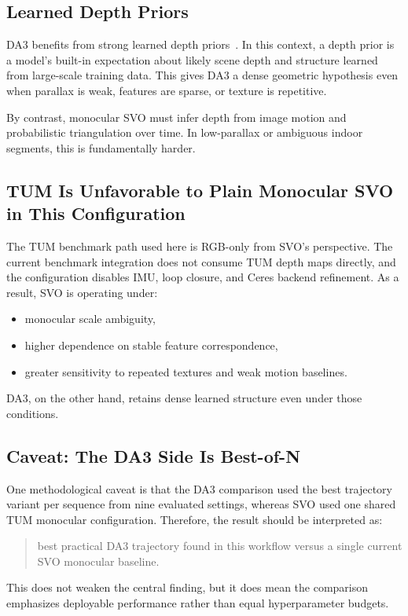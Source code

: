 \documentclass[conference]{IEEEtran}
\begin{document}
\subsection{Learned Depth Priors}
DA3 benefits from strong learned depth priors~\cite{yang2024depthanything}. In this context, a depth prior is a model's built-in expectation about likely scene depth and structure learned from large-scale training data. This gives DA3 a dense geometric hypothesis even when parallax is weak, features are sparse, or texture is repetitive.

By contrast, monocular SVO must infer depth from image motion and probabilistic triangulation over time. In low-parallax or ambiguous indoor segments, this is fundamentally harder.

\subsection{TUM Is Unfavorable to Plain Monocular SVO in This Configuration}
The TUM benchmark path used here is RGB-only from SVO's perspective. The current benchmark integration does not consume TUM depth maps directly, and the configuration disables IMU, loop closure, and Ceres backend refinement. As a result, SVO is operating under:
\begin{itemize}
\item monocular scale ambiguity,
\item higher dependence on stable feature correspondence,
\item greater sensitivity to repeated textures and weak motion baselines.
\end{itemize}

DA3, on the other hand, retains dense learned structure even under those conditions.

\subsection{Caveat: The DA3 Side Is Best-of-N}
One methodological caveat is that the DA3 comparison used the best trajectory variant per sequence from nine evaluated settings, whereas SVO used one shared TUM monocular configuration. Therefore, the result should be interpreted as:

\begin{quote}
best practical DA3 trajectory found in this workflow versus a single current SVO monocular baseline.
\end{quote}

This does not weaken the central finding, but it does mean the comparison emphasizes deployable performance rather than equal hyperparameter budgets.
\end{document}
